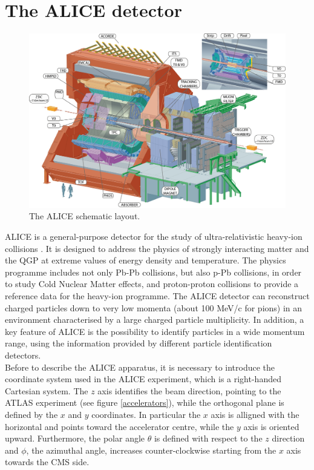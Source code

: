 \documentclass[b5paper,10pt,twoside,oldstyle,classica]{toptesi}
\begin{document}
\section{The ALICE detector}
\begin{figure}[tb]
\begin{center}
\includegraphics[scale = 0.45]{2012-Aug-02-ALICE_3D_v0_with_Text.jpg}
\caption{The ALICE schematic layout.}
\label{ALICE}
\end{center}
\end{figure}
ALICE is a general-purpose detector for the study of ultra-relativistic heavy-ion collisions \cite{Aamodt:2008zz}. It is designed to address the physics of strongly interacting matter and the QGP at extreme values of energy density and temperature. The physics programme includes not only Pb-Pb collisions, but also p-Pb collisions, in order to study Cold Nuclear Matter effects, and proton-proton collisions to provide a reference data for the heavy-ion programme. The ALICE detector can reconstruct charged particles down to
very low momenta (about 100 MeV/c for pions) in an environment characterised by a large charged particle multiplicity. In addition, a key feature of ALICE is the possibility to identify particles in a wide momentum range, using the information provided by different particle identification detectors.\\
Before to describe the ALICE apparatus, it is necessary to introduce the coordinate system used in the ALICE experiment, which is a right-handed Cartesian system. The $z$ axis identifies the beam direction, pointing to the ATLAS experiment (see figure \ref{accelerators}), while the orthogonal plane is defined by the $x$ and $y$ coordinates. In particular the $x$ axis is alligned with the horizontal and points toward the accelerator centre, while the $y$ axis is oriented upward. Furthermore, the polar angle $\theta$ is defined with respect to the $z$ direction and $\phi$, the azimuthal angle, increases counter-clockwise starting from the $x$ axis towards the CMS side.
\end{document}

